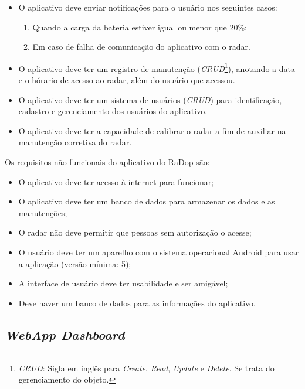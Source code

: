 \begin{itemize}
    \item O aplicativo deve enviar notificações para o usuário nos seguintes casos:
    \begin{enumerate}
        \item Quando a carga da bateria estiver igual ou menor que 20\%;
        \item Em caso de falha de comunicação do aplicativo com o radar.
    \end{enumerate}
\end{itemize}


\begin{itemize}
    \item O aplicativo deve ter um registro de manutenção (\textit{CRUD}\footnote{\textit{CRUD}: Sigla em inglês para \textit{Create}, \textit{Read}, \textit{Update} e \textit{Delete}. Se trata do gerenciamento do objeto.}), anotando a data e o hórario de acesso ao radar, além do usuário que acessou.
\end{itemize}

\begin{itemize}
    \item O aplicativo deve ter um sistema de usuários (\textit{CRUD}) para identificação, cadastro e gerenciamento dos usuários do aplicativo.
    \item O aplicativo deve ter a capacidade de calibrar o radar a fim de auxiliar na manutenção corretiva do radar.
\end{itemize}

Os requisitos não funcionais do aplicativo do RaDop são:

\begin{itemize}
    \item O aplicativo deve ter acesso à internet para funcionar;
    \item O aplicativo deve ter um banco de dados para armazenar os dados e as manutenções;
    \item O radar não deve permitir que pessoas sem autorização o acesse;
    \item O usuário deve ter um aparelho com o sistema operacional Android para usar a aplicação (versão mínima: 5);
    \item A interface de usuário deve ter usabilidade e ser amigável;
    \item Deve haver um banco de dados para as informações do aplicativo.
\end{itemize}

\subsection{\textit{WebApp Dashboard}}

